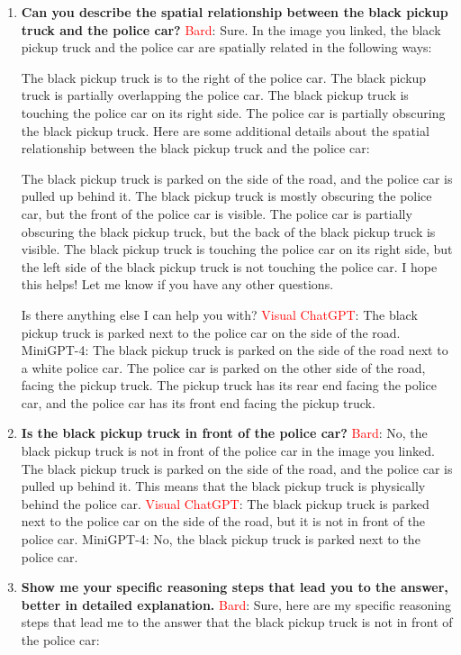     \begin{enumerate}
        \item \textbf{Can you describe the spatial relationship between the  black pickup truck and the police car?}
        \subitem \textcolor{Red}{Bard}: Sure. In the image you linked, the black pickup truck and the police car are spatially related in the following ways:

        The black pickup truck is to the right of the police car.
        The black pickup truck is partially overlapping the police car.
        The black pickup truck is touching the police car on its right side.
        The police car is partially obscuring the black pickup truck.
        Here are some additional details about the spatial relationship between the black pickup truck and the police car:
        
        The black pickup truck is parked on the side of the road, and the police car is pulled up behind it.
        The black pickup truck is mostly obscuring the police car, but the front of the police car is visible.
        The police car is partially obscuring the black pickup truck, but the back of the black pickup truck is visible.
        The black pickup truck is touching the police car on its right side, but the left side of the black pickup truck is not touching the police car.
        I hope this helps! Let me know if you have any other questions.
        
        Is there anything else I can help you with?
        \subitem \textcolor{red}{Visual ChatGPT}: The black pickup truck is parked next to the police car on the side of the road.
        \subitem MiniGPT-4: The black pickup truck is parked on the side of the road next to a white police car. The police car is parked on the other side of the road, facing the pickup truck. The pickup truck has its rear end facing the police car, and the police car has its front end facing the pickup truck.
        \item \textbf{Is the black pickup truck in front of the police car?}
        \subitem \textcolor{Red}{Bard}: No, the black pickup truck is not in front of the police car in the image you linked. The black pickup truck is parked on the side of the road, and the police car is pulled up behind it. This means that the black pickup truck is physically behind the police car.
        \subitem \textcolor{red}{Visual ChatGPT}: The black pickup truck is parked next to the police car on the side of the road, but it is not in front of the police car.
        \subitem MiniGPT-4: No, the black pickup truck is parked next to the police car.
        \item \textbf{Show me your specific reasoning steps that lead you to the answer, better in detailed explanation.}
        \subitem \textcolor{Red}{Bard}: 
        Sure, here are my specific reasoning steps that lead me to the answer that the black pickup truck is not in front of the police car:
        

\end{enumerate}
